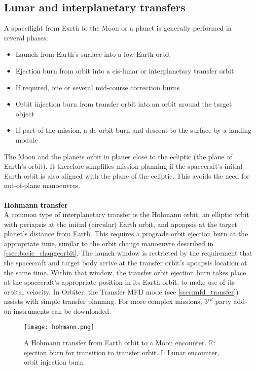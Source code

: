 \documentclass[Orbiter User Manual.tex]{subfiles}
\begin{document}
\subsection{Lunar and interplanetary transfers}
A spaceflight from Earth to the Moon or a planet is generally performed in several phases:

\begin{itemize}
\item Launch from Earth's surface into a low Earth orbit
\item Ejection burn from orbit into a cis-lunar or interplanetary transfer orbit
\item If required, one or several mid-course correction burns
\item Orbit injection burn from transfer orbit into an orbit around the target object
\item If part of the mission, a de-orbit burn and descent to the surface by a landing module
\end{itemize}

\noindent
The Moon and the planets orbit in planes close to the ecliptic (the plane of Earth's orbit). It therefore simplifies mission planning if the spacecraft's initial Earth orbit is also aligned with the plane of the ecliptic. This avoids the need for out-of-plane manoeuvres.\\
\\
\textbf{Hohmann transfer}\\
A common type of interplanetary transfer is the Hohmann orbit, an elliptic orbit with periapsis at the initial (circular) Earth orbit, and apoapsis at the target planet's distance from Earth. This requires a prograde orbit ejection burn at the appropriate time, similar to the orbit change manoeuvre described in \ref{ssec:basic_changeorbit}. The launch window is restricted by the requirement that the spacecraft and target body arrive at the transfer orbit's apoapsis location at the same time. Within that window, the transfer orbit ejection burn takes place at the spacecraft's appropriate position in its Earth orbit, to make use of its orbital velocity. In Orbiter, the Transfer MFD mode (see \ref{ssec:mfd_transfer}) assists with simple transfer planning. For more complex missions, 3$^{rd}$ party add-on instruments can be downloaded.


\begin{figure}[H]
	\centering
	\texttt{[image: hohmann.png]}
	\caption{A Hohmann transfer from Earth orbit to a Moon encounter. E: ejection burn for transition to transfer orbit. I: Lunar encounter, orbit injection burn.}
\end{figure}
\end{document}
